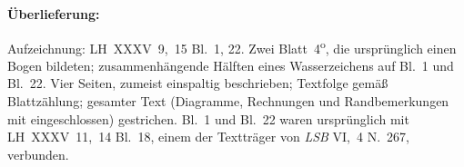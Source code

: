 %
%
%
%
\frenchspacing%
%
\begin{ledgroupsized}[r]{120mm}
\footnotesize
\pstart
\noindent
\textbf{Überlieferung:}
\pend
\end{ledgroupsized}
\begin{ledgroupsized}[r]{114mm}
\footnotesize
\pstart \parindent -6mm
%
Aufzeichnung: LH~XXXV~9,~15 Bl.~1, 22.
Zwei Blatt~4\textsuperscript{o},
die ursprünglich einen \mbox{Bogen} bildeten;
zusammenhängende Hälften eines Wasserzeichens auf Bl.~1 und Bl.~22.
Vier Seiten, zumeist einspaltig beschrieben;
Textfolge gemäß Blattzählung;
gesamter Text (Diagramme, Rechnungen und Randbemerkungen mit eingeschlossen) gestrichen.
Bl.~1 und Bl.~22 waren ursprünglich mit LH~XXXV~11,~14 Bl.~18,
einem der Textträger von \textit{LSB} VI,~4 N.~267,\cite{01339} verbunden.
\pend
\end{ledgroupsized}
%
%
\vspace{5mm}
